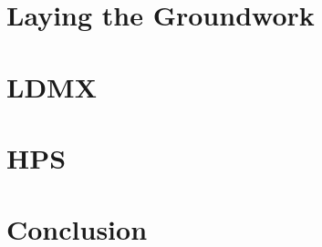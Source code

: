 \documentclass[11pt, oneside]{mnthesis}
\begin{document}



\part{Laying the Groundwork}



\part{LDMX} \label{part:ldmx}




\part{HPS} \label{part:hps}





\part{Conclusion} \label{part:conclusion}





\end{document}
